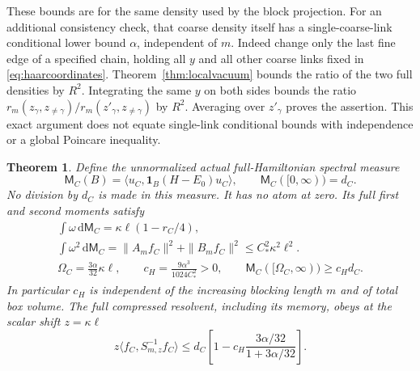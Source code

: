 \documentclass[11pt]{article}
\newtheorem{theorem}{Theorem}[section]
\newcommand{\dd}{\,\mathrm d}
\begin{document}
These bounds are for the same density used by the block projection.
For an additional consistency check, that coarse density itself has a
single-coarse-link conditional lower bound $\alpha$, independent of $m$.
Indeed change only the last fine edge of a specified chain, holding all
$y$ and all other coarse links fixed in \eqref{eq:haarcoordinates}.
Theorem~\ref{thm:localvacuum} bounds the ratio of the two full densities
by $R^2$. Integrating the same $y$ on both sides bounds the ratio
$r_m(z_\gamma,z_{\ne\gamma})/r_m(z'_\gamma,z_{\ne\gamma})$ by $R^2$.
Averaging over $z'_\gamma$ proves the assertion. This exact argument
does not equate single-link conditional bounds with independence or a
global Poincare inequality.

\begin{theorem}\label{thm:spectral}
Define the unnormalized actual full-Hamiltonian spectral measure
\begin{equation}\label{eq:nu}
 \mathsf M_C(B)=\langle u_C,\mathbf1_B(H-E_0)u_C\rangle,\qquad
 \mathsf M_C([0,\infty))=d_C.
\end{equation}
No division by $d_C$ is made in this measure. It has no atom at zero.
Its full first and second moments satisfy
\begin{gather}
 \int\omega\dd\mathsf M_C=\kappa\ell(1-r_C/4),\nonumber\\
 \int\omega^2\dd\mathsf M_C
 =\|A_mf_C\|^2+\|B_mf_C\|^2
 \leq C_*^2\kappa^2\ell^2.\label{eq:moments}\\
 \Omega_C=\frac{3\alpha}{32}\kappa\ell,\qquad
 c_H=\frac{9\alpha^3}{1024C_*^2}>0,\qquad
 \boxed{\mathsf M_C([\Omega_C,\infty))\geq c_Hd_C.}\label{eq:highweight}
\end{gather}
In particular $c_H$ is independent of the increasing blocking length $m$
and of total box volume. The full compressed resolvent, including its
memory, obeys at the scalar shift $z=\kappa\ell$
\begin{equation}\label{eq:resolventdeficit}
 z\langle f_C,S_{m,z}^{-1}f_C\rangle
 \leq d_C\left[1-c_H\frac{3\alpha/32}{1+3\alpha/32}\right].
\end{equation}
\end{theorem}
\end{document}

